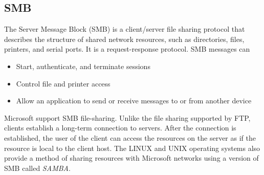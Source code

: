 \subsection{SMB}

The Server Message Block (SMB) is a client/server file sharing protocol that describes the structure of shared network resources, such as directories, files, printers, and serial ports. It is a request-response protocol. SMB messages can

\begin{itemize}
\item Start, authenticate, and terminate sessions
\item Control file and printer access
\item Allow an application to send or receive messages to or from another device
\end{itemize}

Microsoft support SMB file-sharing. Unlike the file sharing supported by FTP, clients establish a long-term connection to servers. After the connection is established, the user of the client can access the resources on the server as if the resource is local to the client host. The LINUX and UNIX operating systems also provide a method of sharing resources with Microsoft networks using a version of SMB called \emph{SAMBA}. 